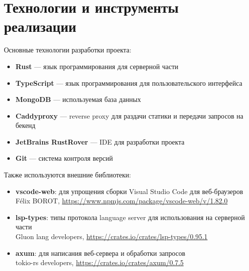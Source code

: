 \documentclass[aspectratio=169,professionalfonts,10pt]{beamer}
\begin{document}
\section{Технологии и инструменты реализации}
\begin{frame}{\insertsection}

Основные технологии разработки проекта:

\begin{itemize}
    \item \textbf{Rust} — язык программирования для серверной части
    \item \textbf{TypeScript} — язык программирования для пользовательского интерфейса
    \item \textbf{MongoDB} — используемая база данных
    \item \textbf{Caddyproxy} — reverse proxy для раздачи статики и передачи запросов на бекенд
    \item \textbf{JetBrains RustRover} — IDE для разработки проекта
    \item \textbf{Git} — система контроля версий
\end{itemize}

Также используются внешние библиотеки:
\begin{itemize}
    \item \textbf{vscode-web}: для упрощения сборки Visual Studio Code для веб-браузеров \\
        {\footnotesize Félix BOROT, \url{https://www.npmjs.com/package/vscode-web/v/1.82.0}}
    \item \textbf{lsp-types}: типы протокола language server для использования на серверной части \\
        {\footnotesize Gluon lang developers, \url{https://crates.io/crates/lsp-types/0.95.1}}
    \item \textbf{axum}: для написания веб-сервера и обработки запросов \\
        {\footnotesize tokio-rs developers, \url{https://crates.io/crates/axum/0.7.5}}
\end{itemize}

\end{frame}
\end{document}
